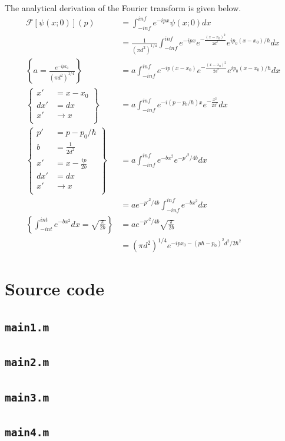 The analytical derivation of the Fourier transform is given below.
\begin{equation}
\begin{split}
	\mathcal{F}\left[\psi(x;0)\right](p) 							& =  \int_{-inf}^{inf} e^{-ipx} \psi(x;0) dx \\
 																	& = \frac{1}{(\pi d^2)^{1/4}}\int_{-inf}^{inf}e^{-ipx}e^{-\frac{(x-x_0)^2}{2d^2}} e^{ip_0(x-x_0)/\hbar}dx\\
\left\{a=\frac{e^{-ipx_0}}{(\pi d^2)^{1/4}}\right\}					& = a \int_{-inf}^{inf}e^{-ip(x-x_0)}e^{-\frac{(x-x_0)^2}{2d^2}}e^{ip_0(x-x_0)/\hbar} dx\\
\left\{
\begin{array}{ll}
x'	& = x-x_0\\
dx' & = dx   \\
x'	& \rightarrow x\\
\end{array}
\right\} 															& = a\int_{-inf}^{inf}e^{-i(p-p_0/\hbar)x}e^{-\frac{x^2}{2d^2}}dx \\
\left\{
\begin{array}{ll}
p'		& = p-p_0/\hbar\\
b		& = \frac{1}{2d^2}   \\
x'		& = x-\frac{ip}{2b}\\
dx'		& = dx\\
x'		& \rightarrow x\\
\end{array}
\right\}															& = a\int_{-inf}^{inf}e^{-bx^2}e^{-p'^2/4b} dx\\
																	& = ae^{-p'^2/4b}\int_{-inf}^{inf}e^{-bx^2} dx\\
\left\{\int_{-int}^{int}e^{-bx^2}dx=\sqrt{\frac{\pi}{2b}}\right\}	& = ae^{-p'^2/4b}\sqrt{\frac{\pi}{2b}}\\
																	& = (\pi d^2)^{1/4}e^{-ipx_0-(p\hbar-p_0)^2d^2/2\hbar^2}
\end{split}
\end{equation}





\appendix
\section{Source code}

\subsection{\texttt{main1.m}}


\subsection{\texttt{main2.m}}


\subsection{\texttt{main3.m}}


\subsection{\texttt{main4.m}}



